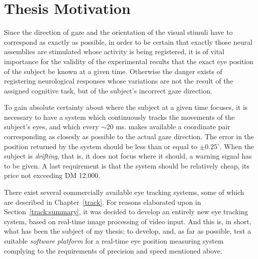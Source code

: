 \section{Thesis Motivation}
\label{intro:motivation}

Since the direction of gaze and the orientation of the visual stimuli
have to correspond as exactly as possible, in order to be certain that
exactly those neural assemblies are stimulated whose activity is being
registered, it is of vital importance for the validity of the
experimental results that the exact eye position of the subject be
known at a given time.  Otherwise the danger exists of registering
neurological responses whose variations are not the result of the
assigned cognitive task, but of the subject's incorrect gaze
direction.

To gain absolute certainty about where the subject at a given time
focuses, it is necessary to have a system which continuously tracks
the movements of the subject's eyes, and which every $\sim$20 ms.
makes available a coordinate pair corresponding as closesly as
possible to the actual gaze direction.  The error in the position
returned by the system should be less than or equal to $\pm
0.25^{\circ}$.  When the subject is {\em drifting\/}, that is, it does
not focus where it should, a warning signal has to be given.  A last
requirement is that the system should be relatively cheap, its price
not exceeding DM 12.000.

There exist several commercially available eye tracking systems, some
of which are described in Chapter~\ref{track}.  For reasons elaborated
upon in Section~\ref{track:summary}, it was decided to develop an
entirely new eye tracking system, based on real-time image processing
of video input.  And this is, in short, what has been the subject of
my thesis; to develop, and, as far as possible, test a suitable {\em
  software platform\/} for a real-time eye position measuring system
complying to the requirements of precision and speed mentioned above.


